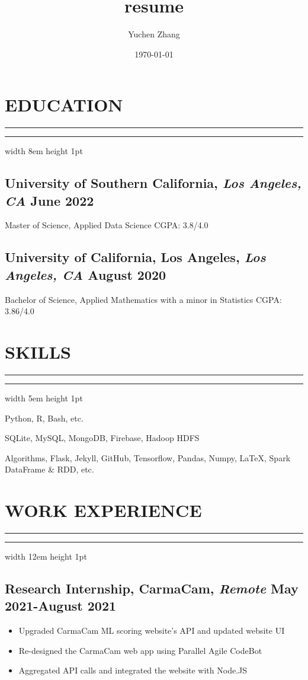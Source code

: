 \documentclass[11pt]{article}
\title{resume}
\author{Yuchen Zhang}
\date{\today}
\newcommand{\divider}[1]{%
	\vskip-2pt %
	{%
		\color{black}%
		\hrule%
	}%
	\nointerlineskip%
	\noindent%
	{%
		\color{black}%
		\hrule width #1 height 1pt%
	}%
	\vskip5pt%
}
\begin{document}
\section*{EDUCATION}
\divider{8em}
\subsection*{University of Southern California{\normalfont, \textit{Los Angeles, CA} \hfill June 2022}}
\noindent
Master of Science, Applied Data Science
\hfill
CGPA: 3.8/4.0

\vspace{0.1in}

\subsection*{University of California, Los Angeles{\normalfont, \textit{Los Angeles, CA} \hfill August 2020}}
\noindent
Bachelor of Science, Applied Mathematics with a minor in Statistics 
\hfill 
CGPA: 3.86/4.0

\vspace{0.1in}

\section*{SKILLS}
\divider{5em}
\begin{description}
    \setlength\itemsep{-1pt}
    \item[Programming Languages] Python, R, Bash, etc.
    \item[Database Management] SQLite, MySQL, MongoDB, Firebase, Hadoop HDFS
    \item[Tools] Algorithms, Flask, Jekyll, GitHub, Tensorflow, Pandas, Numpy, \LaTeX, Spark DataFrame \& RDD, etc.
\end{description}

\section*{WORK EXPERIENCE}
\divider{12em}
\subsection*{Research Internship{\normalfont, CarmaCam, \textit{Remote} \hfill May 2021-August 2021}}
\begin{itemize}
    \setlength\itemsep{-1pt}
    \item Upgraded CarmaCam ML scoring website's API and updated website UI
    \item Re-designed the CarmaCam web app using Parallel Agile\textregistered\xspace CodeBot\textregistered
    \item Aggregated API calls and integrated the website with Node.JS
\end{itemize}
\end{document}
